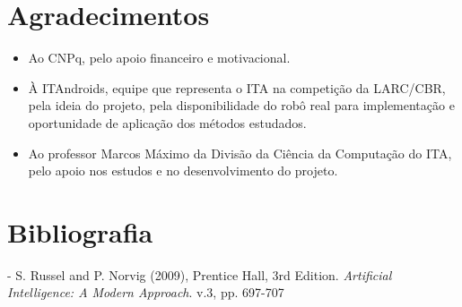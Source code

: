 \documentclass[a4paper,12pt]{article}
\begin{document}
\section{Agradecimentos}

\begin{itemize}
\item Ao CNPq, pelo apoio financeiro e motivacional.
\item À ITAndroids, equipe que representa o ITA na competição da LARC/CBR, pela ideia do projeto, pela disponibilidade do robô real para implementação e oportunidade de aplicação dos métodos estudados.
\item Ao professor Marcos Máximo da Divisão da Ciência da Computação do ITA, pelo apoio nos estudos e no desenvolvimento do projeto.

\end{itemize}

\section{Bibliografia}

\printbibliography

- S. Russel and P. Norvig (2009), Prentice Hall, 3rd Edition. \textit{Artificial Intelligence: A Modern Approach}. v.3, pp. 697-707
\end{document}
